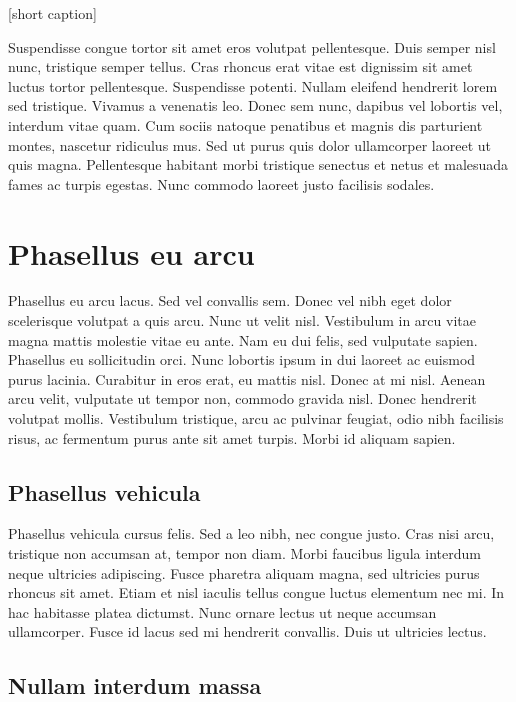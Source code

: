 \begin{center}
[short caption]{%
\kant[1-2]}
\end{center}

Suspendisse congue tortor sit amet eros volutpat pellentesque. Duis semper nisl nunc, tristique semper tellus. Cras rhoncus erat vitae est dignissim sit amet luctus tortor pellentesque. Suspendisse potenti. Nullam eleifend hendrerit lorem sed tristique. Vivamus a venenatis leo. Donec sem nunc, dapibus vel lobortis vel, interdum vitae quam. Cum sociis natoque penatibus et magnis dis parturient montes, nascetur ridiculus mus. Sed ut purus quis dolor ullamcorper laoreet ut quis magna. Pellentesque habitant morbi tristique senectus et netus et malesuada fames ac turpis egestas. Nunc commodo laoreet justo facilisis sodales. 

\section{Phasellus eu arcu}

Phasellus eu arcu lacus. Sed vel convallis sem. Donec vel nibh eget dolor scelerisque volutpat a quis arcu. Nunc ut velit nisl. Vestibulum in arcu vitae magna mattis molestie vitae eu ante. Nam eu dui felis, sed vulputate sapien. Phasellus eu sollicitudin orci. Nunc lobortis ipsum in dui laoreet ac euismod purus lacinia. Curabitur in eros erat, eu mattis nisl. Donec at mi nisl. Aenean arcu velit, vulputate ut tempor non, commodo gravida nisl. Donec hendrerit volutpat mollis. Vestibulum tristique, arcu ac pulvinar feugiat, odio nibh facilisis risus, ac fermentum purus ante sit amet turpis. Morbi id aliquam sapien.

\subsection{Phasellus vehicula}

Phasellus vehicula cursus felis. Sed a leo nibh, nec congue justo. Cras nisi arcu, tristique non accumsan at, tempor non diam. Morbi faucibus ligula interdum neque ultricies adipiscing. Fusce pharetra aliquam magna, sed ultricies purus rhoncus sit amet. Etiam et nisl iaculis tellus congue luctus elementum nec mi. In hac habitasse platea dictumst. Nunc ornare lectus ut neque accumsan ullamcorper. Fusce id lacus sed mi hendrerit convallis. Duis ut ultricies lectus. 

\subsection{Nullam interdum massa}


